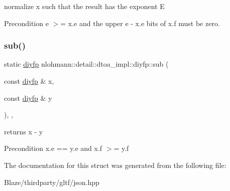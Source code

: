normalize x such that the result has the exponent E 

\begin{DoxyPrecond}{Precondition}
e $>$= x.\+e and the upper e -\/ x.\+e bits of x.\+f must be zero. 
\end{DoxyPrecond}
\mbox{\label{structnlohmann_1_1detail_1_1dtoa__impl_1_1diyfp_aeb26771af54ad73598c1a0430d65d884}} 
\subsubsection{\texorpdfstring{sub()}{sub()}}
{\footnotesize\ttfamily static \hyperlink{structnlohmann_1_1detail_1_1dtoa__impl_1_1diyfp}{diyfp} nlohmann\+::detail\+::dtoa\+\_\+impl\+::diyfp\+::sub (\begin{DoxyParamCaption}\item[{const \hyperlink{structnlohmann_1_1detail_1_1dtoa__impl_1_1diyfp}{diyfp} \&}]{x,  }\item[{const \hyperlink{structnlohmann_1_1detail_1_1dtoa__impl_1_1diyfp}{diyfp} \&}]{y }\end{DoxyParamCaption})\hspace{0.3cm}{\ttfamily [inline]}, {\ttfamily [static]}, {\ttfamily [noexcept]}}



returns x -\/ y 

\begin{DoxyPrecond}{Precondition}
x.\+e == y.\+e and x.\+f $>$= y.\+f 
\end{DoxyPrecond}


The documentation for this struct was generated from the following file\+:\begin{DoxyCompactItemize}
\item 
Blaze/thirdparty/gltf/json.\+hpp\end{DoxyCompactItemize}
